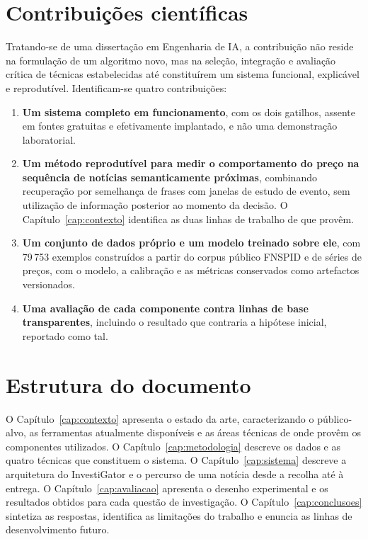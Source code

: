 \section{Contribuições científicas}
\label{sec:intro_contribuicoes}

Tratando-se de uma dissertação em Engenharia de \gls{IA}, a contribuição não reside na formulação
de um algoritmo novo, mas na seleção, integração e avaliação crítica de técnicas estabelecidas até
constituírem um sistema funcional, explicável e reprodutível. Identificam-se quatro contribuições:

\begin{enumerate}
  \item \textbf{Um sistema completo em funcionamento}, com os dois gatilhos, assente em fontes
        gratuitas e efetivamente implantado, e não uma demonstração laboratorial.
  \item \textbf{Um método reprodutível para medir o comportamento do preço na sequência de
        notícias semanticamente próximas}, combinando recuperação por semelhança de frases com
        janelas de estudo de evento, sem utilização de informação posterior ao momento da decisão.
        O Capítulo~\ref{cap:contexto} identifica as duas linhas de trabalho de que provêm.
  \item \textbf{Um conjunto de dados próprio e um modelo treinado sobre ele}, com 79\,753 exemplos
        construídos a partir do corpus público \gls{FNSPID} \autocite{dong2024fnspid} e de séries
        de preços, com o modelo, a calibração e as métricas conservados como artefactos
        versionados.
  \item \textbf{Uma avaliação de cada componente contra linhas de base transparentes}, incluindo o
        resultado que contraria a hipótese inicial, reportado como tal.
\end{enumerate}

\section{Estrutura do documento}
\label{sec:intro_estrutura}

O Capítulo~\ref{cap:contexto} apresenta o estado da arte, caracterizando o público-alvo, as
ferramentas atualmente disponíveis e as áreas técnicas de onde provêm os componentes utilizados.
O Capítulo~\ref{cap:metodologia} descreve os dados e as quatro técnicas que constituem o sistema.
O Capítulo~\ref{cap:sistema} descreve a arquitetura do InvestiGator e o percurso de uma notícia
desde a recolha até à entrega. O Capítulo~\ref{cap:avaliacao} apresenta o desenho experimental e
os resultados obtidos para cada questão de investigação. O Capítulo~\ref{cap:conclusoes} sintetiza
as respostas, identifica as limitações do trabalho e enuncia as linhas de desenvolvimento futuro.

